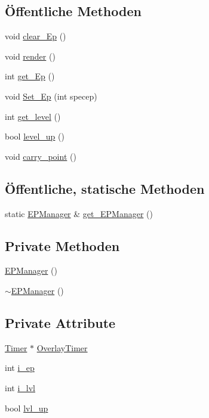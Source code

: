 \subsection*{Öffentliche Methoden}
\begin{DoxyCompactItemize}
\item 
void \hyperlink{class_e_p_manager_ab16a464979242e27ab1de48a2fa8d193}{clear\-\_\-\-Ep} ()
\item 
void \hyperlink{class_e_p_manager_ae0839a39f9ee6fd51d67faafbd6ff560}{render} ()
\item 
int \hyperlink{class_e_p_manager_aadec631b4cc9f5de5f4f8040aeeb1778}{get\-\_\-\-Ep} ()
\item 
void \hyperlink{class_e_p_manager_a300554dc6cd44d47ece8ebe6d8ed2daa}{Set\-\_\-\-Ep} (int specep)
\item 
int \hyperlink{class_e_p_manager_af8b59848547dee1ab3967aaebcf8fc3a}{get\-\_\-level} ()
\item 
bool \hyperlink{class_e_p_manager_ad6ec1c64ea6b54f646bb793ad53e0279}{level\-\_\-up} ()
\item 
void \hyperlink{class_e_p_manager_a1eac7449962fd356c97f588dbbf0e39e}{carry\-\_\-point} ()
\end{DoxyCompactItemize}
\subsection*{Öffentliche, statische Methoden}
\begin{DoxyCompactItemize}
\item 
static \hyperlink{class_e_p_manager}{E\-P\-Manager} \& \hyperlink{class_e_p_manager_a7dd8287b28c4c0fc6e39e8846ee4bbc5}{get\-\_\-\-E\-P\-Manager} ()
\end{DoxyCompactItemize}
\subsection*{Private Methoden}
\begin{DoxyCompactItemize}
\item 
\hyperlink{class_e_p_manager_a91e36a44fee123f8c97729b1cbae888e}{E\-P\-Manager} ()
\item 
\hyperlink{class_e_p_manager_ae55c5e33257d1f2001324e5ba4b4e8e8}{$\sim$\-E\-P\-Manager} ()
\end{DoxyCompactItemize}
\subsection*{Private Attribute}
\begin{DoxyCompactItemize}
\item 
\hyperlink{class_timer}{Timer} $\ast$ \hyperlink{class_e_p_manager_a93cd7523f6b1fd86a8dc62976bcd2c88}{Overlay\-Timer}
\item 
int \hyperlink{class_e_p_manager_a882d4694fe62f9cdb3e733f834cd0219}{i\-\_\-ep}
\item 
int \hyperlink{class_e_p_manager_aac2f80caa45bf38ae7af14f341f4dfd5}{i\-\_\-lvl}
\item 
bool \hyperlink{class_e_p_manager_abe039770fe63d4e4e685ed5abf738fa6}{lvl\-\_\-up}
\end{DoxyCompactItemize}


